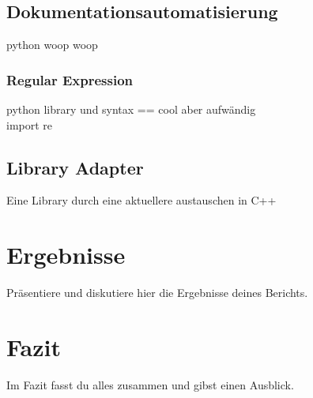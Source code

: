 \documentclass[a4paper, 12pt]{article}
\begin{document}
\subsection{Dokumentationsautomatisierung}\label{Dokumentationsautomatisierung}
python woop woop
\subsubsection{Regular Expression}\label{regularExpression}
python library und syntax == cool aber aufwändig \\
import re

\subsection{Library Adapter}\label{LibraryAdapter}
Eine Library durch eine aktuellere austauschen in C++

\newpage
\section{Ergebnisse}
Präsentiere und diskutiere hier die Ergebnisse deines Berichts.

\newpage
\section{Fazit}
Im Fazit fasst du alles zusammen und gibst einen Ausblick.

\newpage

\end{document}
